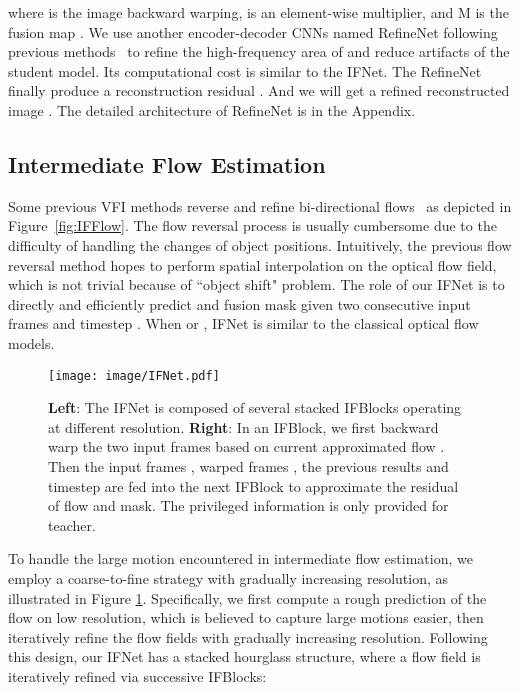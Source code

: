 \documentclass[final]{cvpr}
\begin{document}
where  is the image backward warping,  is an element-wise multiplier, and M is the fusion map . We use another encoder-decoder CNNs named RefineNet following previous methods~\cite{jiang2018super, niklaus2020softmax} to refine the high-frequency area of  and reduce artifacts of the student model. Its computational cost is similar to the IFNet. The RefineNet finally produce a reconstruction residual . And we will get a refined reconstructed image . The detailed architecture of RefineNet is in the Appendix.

\subsection{Intermediate Flow Estimation}
\label{subsec:architecture}






Some previous VFI methods reverse and refine bi-directional flows~\cite{jiang2018super, xu2019quadratic, bao2019depth, liu2020enhanced} as depicted in Figure~\ref{fig:IFFlow}. The flow reversal process is usually cumbersome due to the difficulty of handling the changes of object positions. Intuitively, the previous flow reversal method hopes to perform spatial interpolation on the optical flow field, which is not trivial because of ``object shift" problem. The role of our IFNet is to directly and efficiently predict  and fusion mask  given two consecutive input frames  and timestep . When  or , IFNet is similar to the classical optical flow models.

\begin{figure}[t]
	\centering
	\texttt{[image: image/IFNet.pdf]}
	\caption{\textbf{Left}: The IFNet is composed of several stacked IFBlocks operating at different resolution. \textbf{Right}: In an IFBlock, we first backward warp the two input frames based on current approximated flow . Then the input frames , warped frames , the previous results  and timestep  are fed into the next IFBlock to approximate the residual of flow and mask. The privileged information  is only provided for teacher. }\label{fig:IFNet}
\end{figure}


To handle the large motion encountered in intermediate flow estimation, we employ a coarse-to-fine strategy with gradually increasing resolution, as illustrated in Figure \ref{fig:IFNet}. Specifically, we first compute a rough prediction of the flow on low resolution, which is believed to capture large motions easier, then iteratively refine the flow fields with gradually increasing resolution. Following this design, our IFNet has a stacked hourglass structure, where a flow field is iteratively refined via successive IFBlocks:
\end{document}
